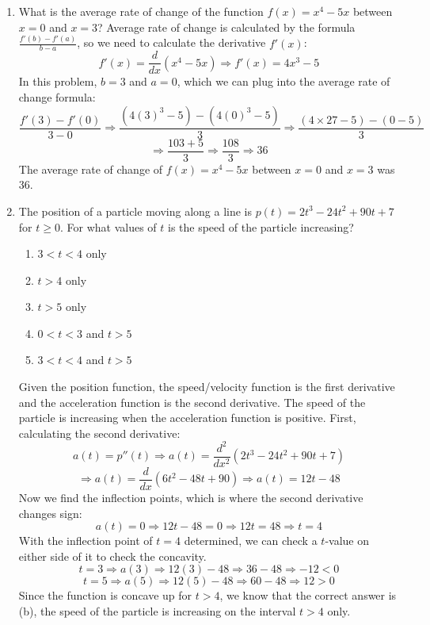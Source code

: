 \documentclass{article}
\begin{document}
\begin{enumerate}
\pagebreak
\item What is the average rate of change of the function $f(x) = x^{4} - 5x$ between $x = 0$ and $x = 3$?
Average rate of change is calculated by the formula $\frac{f'(b) - f'(a)}{b - a}$, so we need to calculate
the derivative $f'(x)$:
\[f'(x) = \frac{d}{dx}\left(x^{4} - 5x\right) \Longrightarrow f'(x) = 4x^{3} - 5\]
In this problem, $b = 3$ and $a = 0$, which we can plug into the average rate of change formula:
\[\frac{f'(3) - f'(0)}{3 - 0}
    \Longrightarrow \frac{\left(4{(3)}^{3} - 5\right) - \left(4{(0)}^{3} - 5\right)}{3}
    \Longrightarrow \frac{(4\times 27 - 5) - (0 - 5)}{3}\]
\[\Longrightarrow \frac{103 + 5}{3} \Longrightarrow \frac{108}{3} \Longrightarrow 36\]
The average rate of change of $f(x) = x^{4} - 5x$ between $x = 0$ and $x = 3$ was $36$.

\item The position of a particle moving along a line is $p(t) = 2t^{3} - 24t^{2} + 90t + 7$ for $t \geq 0$.
For what values of $t$ is the speed of the particle increasing?
    \begin{enumerate}
        \item $3 < t < 4$ only
        \item $t > 4$ only
        \item $t > 5$ only
        \item $0 < t < 3$ and $t > 5$
        \item $3 < t < 4$ and $t > 5$
    \end{enumerate}

Given the position function, the speed/velocity function is the first derivative and the acceleration
function is the second derivative. The speed of the particle is increasing when the acceleration function
is positive. First, calculating the second derivative:
\[a(t) = p''(t) \Longrightarrow a(t) = \frac{d^{2}}{dx^{2}}\left(2t^{3} - 24t^{2} + 90t + 7\right)\]
\[\Longrightarrow a(t) = \frac{d}{dx}\left(6t^{2} - 48t + 90\right) \Longrightarrow a(t) = 12t - 48\]
Now we find the inflection points, which is where the second derivative changes sign:
\[a(t) = 0 \Longrightarrow 12t - 48 = 0 \Longrightarrow 12t = 48 \Longrightarrow t = 4\]
With the inflection point of $t = 4$ determined, we can check a $t$-value on either side of it to check
the concavity.
\[t = 3 \Longrightarrow a(3) \Longrightarrow 12(3) - 48 \Longrightarrow 36 - 48 \Longrightarrow -12 < 0\]
\[t = 5 \Longrightarrow a(5) \Longrightarrow 12(5) - 48 \Longrightarrow 60 - 48 \Longrightarrow 12 > 0\]
Since the function is concave up for $t > 4$, we know that the correct answer is (b), the speed of the
particle is increasing on the interval $t > 4$ only.


\end{enumerate}
\end{document}
